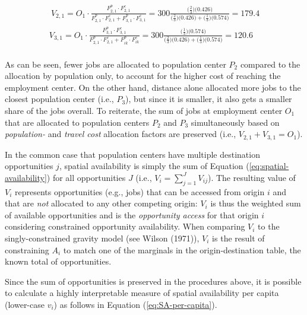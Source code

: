 \documentclass[]{elsarticle} %
\begin{document}
\begin{equation}
\label{eq:SA-2populations}
\begin{array}{l}\
V_{2,1} = O_1\cdot \frac{F^p_{2,1} \cdot F^c_{2,1}}{F^p_{2,1} \cdot F^c_{2,1} + F^p_{3,1} \cdot F^c_{3,1}} = 300 \frac{\big(\frac{2}{3} \big) \big(0.426 \big)}{\big(\frac{2}{3} \big) \big(0.426 \big) + \big(\frac{1}{3} \big) \big(0.574 \big)} = 179.4\\
V_{3,1} = O_1\cdot \frac{F^p_{3,1} \cdot F^c_{3,1}}{F^p_{2,1} \cdot F^c_{2,1} + F^p_{ik} \cdot F^c_{ik}} = 300 \frac{\big(\frac{1}{3} \big) \big(0.574 \big)}{\big(\frac{2}{3} \big) \big(0.426 \big) + \big(\frac{1}{3} \big) \big(0.574 \big)}  =  120.6 \\
\end{array}
\end{equation}

As can be seen, fewer jobs are allocated to population center \(P_2\)
compared to the allocation by population only, to account for the higher
cost of reaching the employment center. On the other hand, distance
alone allocated more jobs to the closest population center (i.e.,
\(P_3\)), but since it is smaller, it also gets a smaller share of the
jobs overall. To reiterate, the sum of jobs at employment center \(O_1\)
that are allocated to population centers \(P_2\) and \(P_3\)
simultaneously based on \emph{population-} and \emph{travel cost}
allocation factors are preserved (i.e., \(V_{2,1} + V_{3,1} = O_1\)).

In the common case that population centers have multiple destination
opportunities \(j\), spatial availability is simply the sum of Equation
(\ref{eq:spatial-availability}) for all opportunities \(J\) (i.e.,
\(V_i = \sum_{j=1}^J V_{ij}\)). The resulting value of \(V_i\)
represents opportunities (e.g., jobs) that can be accessed from origin
\(i\) and that are \emph{not} allocated to any other competing origin:
\(V_i\) is thus the weighted sum of available opportunities and is the
\emph{opportunity access} for that origin \(i\) considering constrained
opportunity availability. When comparing \(V_i\) to the
singly-constrained gravity model (see Wilson (1971)), \(V_i\) is the
result of constraining \(A_i\) to match one of the marginals in the
origin-destination table, the known total of opportunities.

Since the sum of opportunities is preserved in the procedures above, it
is possible to calculate a highly interpretable measure of spatial
availability per capita (lower-case \(v_i\)) as follows in Equation
(\ref{eq:SA-per-capita}).
\end{document}

